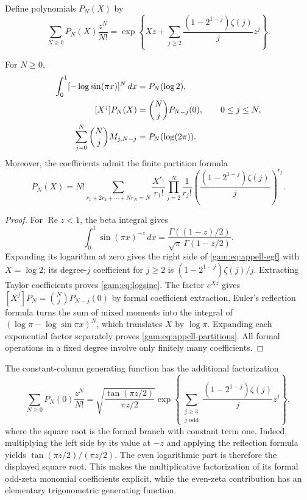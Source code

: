 Define polynomials $P_N(X)$ by
\begin{equation}\label{gam:eq:appell-egf}
 \sum_{N\ge0}P_N(X)\frac{z^N}{N!}
 =\exp\left\{Xz+\sum_{j\ge2}
       \frac{(1-2^{1-j})\zeta(j)}jz^j\right\}.
\end{equation}
\begin{proposition}
\label{gam:prop:appell}
For $N\ge0$,
\begin{align}
 \int_0^1[-\log\sin(\pi x)]^N\,dx&=P_N(\log2),\label{gam:eq:logsine}\\
 [X^j]P_N(X)&=\binom Nj P_{N-j}(0),\qquad 0\le j\le N,\notag\\
 \sum_{j=0}^N\binom Nj M_{j,N-j}&=P_N(\log(2\pi)).\notag
\end{align}
Moreover, the coefficients admit the finite partition formula
\begin{equation}\label{gam:eq:appell-partitions}
 P_N(X)=N!\!\sum_{r_1+2r_2+\cdots+Nr_N=N}
 \frac{X^{r_1}}{r_1!}
 \prod_{j=2}^N\frac1{r_j!}
 \left(\frac{(1-2^{1-j})\zeta(j)}j\right)^{r_j}.
\end{equation}
\end{proposition}
\begin{proof}
For $\operatorname{Re}z<1$, the beta integral gives
\[
 \int_0^1\sin(\pi x)^{-z}\,dx
 =\frac{\Gamma((1-z)/2)}{\sqrt\pi\,\Gamma(1-z/2)}.
\]
Expanding its logarithm at zero gives the right side of
\eqref{gam:eq:appell-egf} with $X=\log2$; its degree-$j$ coefficient
for $j\ge2$ is $(1-2^{1-j})\zeta(j)/j$.
Extracting Taylor coefficients proves \eqref{gam:eq:logsine}.
The factor $e^{Xz}$ gives $[X^j]P_N=\binom NjP_{N-j}(0)$ by
formal coefficient extraction.  Euler's reflection formula turns
the sum of mixed moments into the integral of
$(\log\pi-\log\sin\pi x)^N$, which translates $X$ by $\log\pi$.
Expanding each exponential factor separately proves
\eqref{gam:eq:appell-partitions}.  All formal operations in a fixed
degree involve only finitely many coefficients.
\end{proof}

The constant-column generating function has the additional factorization
\begin{equation}\label{gam:eq:even-odd-factor}
 \sum_{N\ge0}P_N(0)\frac{z^N}{N!}
 =\sqrt{\frac{\tan(\pi z/2)}{\pi z/2}}
 \exp\left\{\sum_{\substack{j\ge3\\j\text{ odd}}}
       \frac{(1-2^{1-j})\zeta(j)}jz^j\right\},
\end{equation}
where the square root is the formal branch with constant term one.
Indeed, multiplying the left side by its value at $-z$ and applying
the reflection formula yields $\tan(\pi z/2)/(\pi z/2)$.
The even logarithmic part is therefore the displayed square root.
This makes the multiplicative factorization of its formal odd-zeta
monomial coefficients explicit, while the even-zeta contribution has
an elementary trigonometric generating function.

